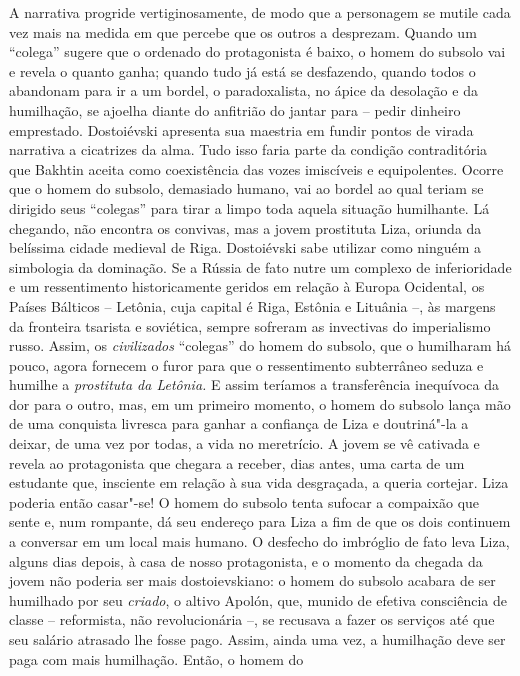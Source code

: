 {{A narrativa progride vertiginosamente, de modo que a personagem se
mutile cada vez mais na medida em que percebe que os outros a desprezam.
Quando um ``colega'' sugere que o ordenado do protagonista é baixo, o
homem do subsolo vai e revela o quanto ganha; quando tudo já está se
desfazendo, quando todos o abandonam para ir a um bordel, o
paradoxalista, no ápice da desolação e da humilhação, se ajoelha diante
do anfitrião do jantar para -- pedir dinheiro emprestado. Dostoiévski
apresenta sua maestria em fundir pontos de virada narrativa a cicatrizes
da alma. Tudo isso faria parte da condição contraditória que Bakhtin
aceita como coexistência das vozes imiscíveis e equipolentes. Ocorre que
o homem do subsolo, demasiado humano, vai ao bordel ao qual teriam se
dirigido seus ``colegas'' para tirar a limpo toda aquela situação
humilhante. Lá chegando, não encontra os convivas, mas a jovem
prostituta Liza, oriunda da belíssima cidade medieval de Riga.
Dostoiévski sabe utilizar como ninguém a simbologia da dominação. Se a
Rússia de fato nutre um complexo de inferioridade e um ressentimento
historicamente geridos em relação à Europa Ocidental, os Países Bálticos
-- Letônia, cuja capital é Riga, Estônia e Lituânia --, às margens da
fronteira tsarista e soviética, sempre sofreram as invectivas do
imperialismo russo. Assim, os \emph{civilizados} ``colegas'' do homem do
subsolo, que o humilharam há pouco, agora fornecem o furor para que o
ressentimento subterrâneo seduza e humilhe a \emph{prostituta da
Letônia.} E assim teríamos a transferência inequívoca da dor para o
outro, mas, em um primeiro momento, o homem do subsolo lança mão de uma
conquista livresca para ganhar a confiança de Liza e doutriná"-la a
deixar, de uma vez por todas, a vida no meretrício. A jovem se vê
cativada e revela ao protagonista que chegara a receber, dias antes, uma
carta de um estudante que, insciente em relação à sua vida desgraçada, a
queria cortejar. Liza poderia então casar"-se! O homem do subsolo tenta
sufocar a compaixão que sente e, num rompante, dá seu endereço para Liza
a fim de que os dois continuem a conversar em um local mais humano. O
desfecho do imbróglio de fato leva Liza, alguns dias depois, à casa de
nosso protagonista, e o momento da chegada da jovem não poderia ser mais
dostoievskiano: o homem do subsolo acabara de ser humilhado por seu
\emph{criado}, o altivo Apolón, que, munido de efetiva consciência de
classe -- reformista, não revolucionária --, se recusava a fazer os
serviços até que seu salário atrasado lhe fosse pago. Assim, ainda uma
vez, a humilhação deve ser paga com mais humilhação. Então, o homem do
}}
